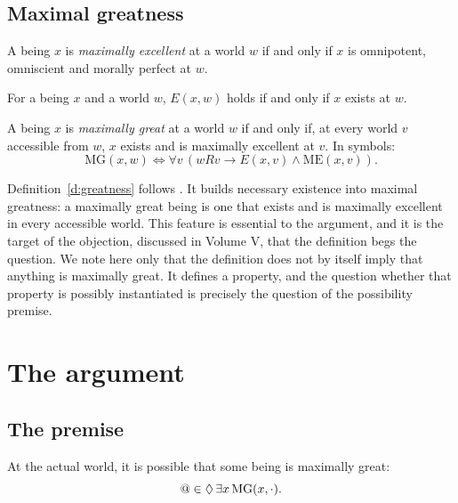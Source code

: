 \documentclass{situationist-preprint}
\begin{document}
\subsection{Maximal greatness}

\begin{definition}\label{d:excellence}
A being $x$ is \emph{maximally excellent} at a world $w$ if and only if $x$ is omnipotent, omniscient and morally perfect at $w$.
\end{definition}

\begin{definition}\label{d:existence}
For a being $x$ and a world $w$, $E(x,w)$ holds if and only if $x$ exists at $w$.
\end{definition}

\begin{definition}\label{d:greatness}
A being $x$ is \emph{maximally great} at a world $w$ if and only if, at every world $v$ accessible from $w$, $x$ exists and is maximally excellent at $v$. In symbols:
\[
\mathrm{MG}(x, w) \iff \forall v\,(wRv \to E(x,v) \wedge \mathrm{ME}(x,v)).
\]
\end{definition}

Definition~\ref{d:greatness} follows \citet{Plantinga1974}. It builds necessary existence into maximal greatness: a maximally great being is one that exists and is maximally excellent in every accessible world. This feature is essential to the argument, and it is the target of the objection, discussed in Volume V, that the definition begs the question. We note here only that the definition does not by itself imply that anything is maximally great. It defines a property, and the question whether that property is possibly instantiated is precisely the question of the possibility premise.

\section{The argument}

\subsection{The premise}

\begin{assumption}\label{a:possibility}
At the actual world, it is possible that some being is maximally great:
\[
@ \in \mathord{\Diamond}\,\exists x\, \mathrm{MG}(x, \cdot).
\]
\end{assumption}
\end{document}
